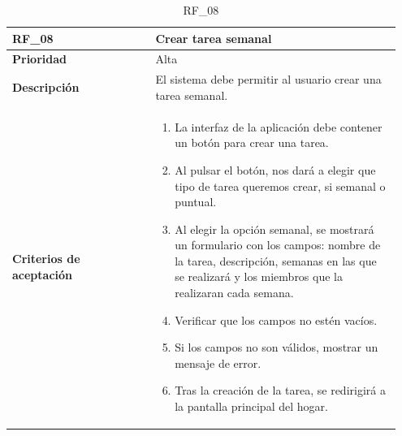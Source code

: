 \begin{table}[htb!]
    \begin{tabular}{|p{0.35\linewidth}|p{0.6\linewidth}|}
        \hline
        \rowcolor[HTML]{C0C0C0}  
        \textbf{RF\_08} & \textbf{Crear tarea semanal} \\
        \hline
        \textbf{Prioridad} & Alta \\
        \hline
        \textbf{Descripción} & El sistema debe permitir al usuario crear una tarea semanal.  \\
        \hline
        \vspace{0.5mm}
        \textbf{Criterios de aceptación} & 
        \begin{minipage}[t]{0.9\linewidth}
            \begin{enumerate}
                \item La interfaz de la aplicación debe contener un botón para crear una tarea.
                \item Al pulsar el botón, nos dará a elegir que tipo de tarea queremos crear, si semanal o puntual.
                \item Al elegir la opción semanal, se mostrará un formulario con los campos: nombre de la tarea, descripción, semanas en las que se realizará y los miembros que la realizaran cada semana. 
                \item Verificar que los campos no estén vacíos.
                \item Si los campos no son válidos, mostrar un mensaje de error.
                \item Tras la creación de la tarea, se redirigirá a la pantalla principal del hogar.
            \end{enumerate}
            \vspace{2mm}
        \end{minipage} \\
        \hline
    \end{tabular}
    \caption{RF\_08}

\end{table}

